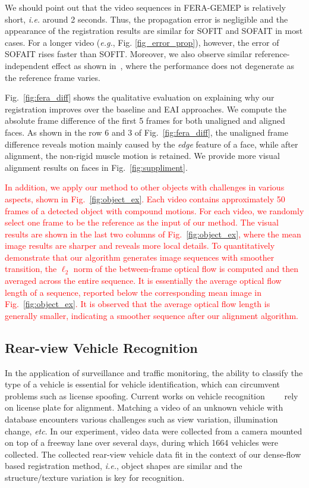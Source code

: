 \documentclass[10pt,journal]{IEEEtran}
\newcommand{\Songfan}[1]{\textcolor{red}{#1}}
\begin{document}
We should point out that the video sequences in FERA-GEMEP is relatively short, \textit{i.e.} around 2 seconds. Thus, the propagation error is negligible and the appearance of the registration results are similar for SOFIT and SOFAIT in most cases. For a longer video (\textit{e.g.}, Fig. \ref{fig_error_prop}), however, the error of SOFAIT rises faster than SOFIT. Moreover, we also observe similar reference-independent effect as shown in~\cite{Yang_FG13}, where the performance does not degenerate as the reference frame varies. 

Fig.~\ref{fig:fera_diff} shows the qualitative evaluation on explaining why our registration improves over the baseline and EAI approaches. We compute the absolute frame difference of the first 5 frames for both unaligned and aligned faces. As shown in the row 6 and 3 of Fig.~\ref{fig:fera_diff}, the unaligned frame difference reveals motion mainly caused by the \textit{edge} feature of a face, while after alignment, the non-rigid muscle motion is retained. We provide more visual alignment results on faces in Fig.~\ref{fig:suppliment}.

\Songfan{
In addition, we apply our method to other objects with challenges in various aspects, shown in Fig.~\ref{fig:object_ex}. Each video contains approximately 50 frames of a detected object with compound motions. For each video, we randomly select one frame to be the reference as the input of our method. The visual results are shown in the last two columns of Fig.~\ref{fig:object_ex}, where the mean image results are sharper and reveals more local details. To quantitatively demonstrate that our algorithm generates image sequences with smoother transition, the $\ell_2$ norm of the between-frame optical flow is computed and then averaged across the entire sequence. It is essentially the average optical flow length of a sequence, reported below the corresponding mean image in Fig.~\ref{fig:object_ex}. It is observed that the average optical flow length is generally smaller, indicating a smoother sequence after our alignment algorithm.
}


\subsection{Rear-view Vehicle Recognition}


In the application of surveillance and traffic monitoring, the ability to classify the type of a vehicle is essential for vehicle identification, which can circumvent problems such as license spoofing. Current works on vehicle recognition~\cite{Petrovic04}~\cite{Negri06}~\cite{Zafar09}~\cite{Pearce11} rely on license plate for alignment. Matching a video of an unknown vehicle with database encounters various challenges such as view variation, illumination change, \textit{etc}. In our experiment, video data were collected from a camera mounted on top of a freeway lane over several days, during which 1664 vehicles were collected. The collected rear-view vehicle data fit in the context of our dense-flow based registration method, \textit{i.e.}, object shapes are similar and the structure/texture variation is key for recognition. 
\end{document}
